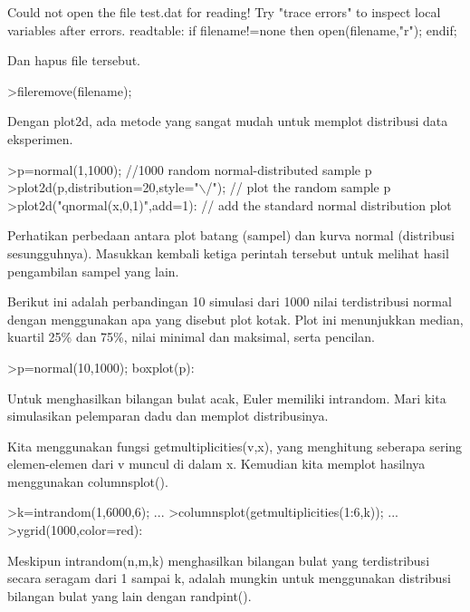 \documentclass[a4paper,10pt]{article}
\begin{document}
\begin{eulernotebook}
\begin{euleroutput}
  Could not open the file
  test.dat
  for reading!
  Try "trace errors" to inspect local variables after errors.
  readtable:
      if filename!=none then open(filename,"r"); endif;
\end{euleroutput}
\begin{eulercomment}
Dan hapus file tersebut.
\end{eulercomment}
\begin{eulerprompt}
>fileremove(filename);
\end{eulerprompt}
\begin{eulercomment}
Dengan plot2d, ada metode yang sangat mudah untuk memplot distribusi
data eksperimen.
\end{eulercomment}
\begin{eulerprompt}
>p=normal(1,1000); //1000 random normal-distributed sample p
>plot2d(p,distribution=20,style="\(\backslash\)/"); // plot the random sample p
>plot2d("qnormal(x,0,1)",add=1): // add the standard normal distribution plot
\end{eulerprompt}
\begin{eulercomment}
Perhatikan perbedaan antara plot batang (sampel) dan kurva normal
(distribusi sesungguhnya). Masukkan kembali ketiga perintah tersebut
untuk melihat hasil pengambilan sampel yang lain.
\end{eulercomment}
\begin{eulercomment}
Berikut ini adalah perbandingan 10 simulasi dari 1000 nilai
terdistribusi normal dengan menggunakan apa yang disebut plot kotak.
Plot ini menunjukkan median, kuartil 25\% dan 75\%, nilai minimal dan
maksimal, serta pencilan.
\end{eulercomment}
\begin{eulerprompt}
>p=normal(10,1000); boxplot(p):
\end{eulerprompt}
\begin{eulercomment}
Untuk menghasilkan bilangan bulat acak, Euler memiliki intrandom. Mari
kita simulasikan pelemparan dadu dan memplot distribusinya.

Kita menggunakan fungsi getmultiplicities(v,x), yang menghitung
seberapa sering elemen-elemen dari v muncul di dalam x. Kemudian kita
memplot hasilnya menggunakan columnsplot().
\end{eulercomment}
\begin{eulerprompt}
>k=intrandom(1,6000,6);  ...
>columnsplot(getmultiplicities(1:6,k));  ...
>ygrid(1000,color=red):
\end{eulerprompt}
\begin{eulercomment}
Meskipun intrandom(n,m,k) menghasilkan bilangan bulat yang
terdistribusi secara seragam dari 1 sampai k, adalah mungkin untuk
menggunakan distribusi bilangan bulat yang lain dengan randpint().


\end{eulercomment}
\end{eulernotebook}
\end{document}
